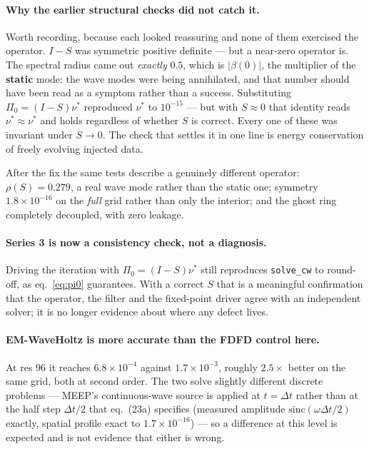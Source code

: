 \documentclass[11pt]{article}
\begin{document}
\paragraph{Why the earlier structural checks did not catch it.}
Worth recording, because each looked reassuring and none of them exercised the
operator. $I-S$ was symmetric positive definite --- but a near-zero operator is.
The spectral radius came out \emph{exactly} $0.5$, which is $|\beta(0)|$, the
multiplier of the \textbf{static} mode: the wave modes were being annihilated,
and that number should have been read as a symptom rather than a success.
Substituting $\Pi_0 = (I-S)\nu^\ast$ reproduced $\nu^\ast$ to $10^{-15}$ --- but
with $S \approx 0$ that identity reads $\nu^\ast \approx \nu^\ast$ and holds
regardless of whether $S$ is correct. Every one of these was invariant under
$S \to 0$. The check that settles it in one line is energy conservation of
freely evolving injected data.

After the fix the same tests describe a genuinely different operator:
$\rho(S) = 0.279$, a real wave mode rather than the static one; symmetry
$1.8\times10^{-16}$ on the \emph{full} grid rather than only the interior; and
the ghost ring completely decoupled, with zero leakage.

\paragraph{Series 3 is now a consistency check, not a diagnosis.}
Driving the iteration with $\Pi_0 = (I-S)\nu^\ast$ still reproduces
\texttt{solve\_cw} to round-off, as eq.~\eqref{eq:pi0} guarantees. With a correct
$S$ that is a meaningful confirmation that the operator, the filter and the
fixed-point driver agree with an independent solver; it is no longer evidence
about where any defect lives.

\paragraph{EM-WaveHoltz is more accurate than the FDFD control here.}
At res $96$ it reaches $6.8\times10^{-4}$ against $1.7\times10^{-3}$, roughly
$2.5\times$ better on the same grid, both at second order. The two solve slightly
different discrete problems --- MEEP's continuous-wave source is applied at
$t = \Delta t$ rather than at the half step $\Delta t/2$ that eq.~(23a)
specifies (measured amplitude $\mathrm{sinc}(\omega\Delta t/2)$ exactly, spatial
profile exact to $1.7\times10^{-16}$) --- so a difference at this level is
expected and is not evidence that either is wrong.
\end{document}
